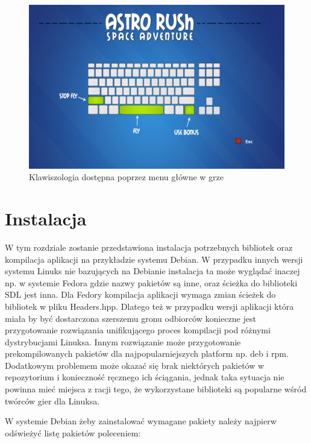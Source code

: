 \begin{figure}[h]
    \centering
    \includegraphics[width=429px]{./Pictures/menu3.png}
    \caption{Klawiszologia dostępna poprzez menu główne w grze}
\end{figure}


\section{Instalacja}
W tym rozdziale zostanie przedstawiona instalacja potrzebnych bibliotek oraz kompilacja aplikacji na przykładzie systemu Debian. W przypadku innych wersji systemu Linuks nie bazujących na Debianie instalacja ta może wyglądać inaczej np. w systemie Fedora gdzie nazwy pakietów są inne, oraz ścieżka do biblioteki SDL jest inna. Dla Fedory kompilacja aplikacji wymaga zmian ścieżek do bibliotek w pliku Headers.hpp. Dlatego też w przypadku wersji aplikacji która miała by być dostarczona szerszemu gronu odbiorców konieczne jest przygotowanie rozwiązania unifikującego proces kompilacji pod różnymi dystrybucjami Linuksa. Innym rozwiązanie może przygotowanie prekompilowanych pakietów dla najpopularniejszych platform np. deb i rpm. Dodatkowym problemem może okazać się brak niektórych pakietów w repozytorium i konieczność ręcznego ich ściągania, jednak taka sytuacja nie powinna mieć miejsca z racji tego, że wykorzystane biblioteki są popularne wśród twórców gier dla Linuksa. 

W systemie Debian żeby zainstalować wymagane pakiety należy najpierw odświeżyć listę pakietów poleceniem: 

